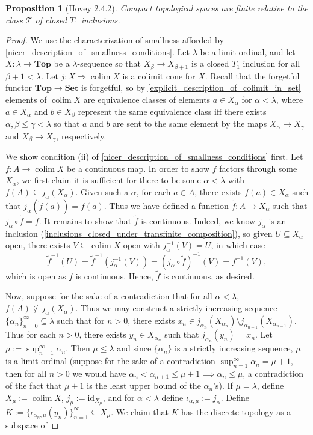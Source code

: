 \documentclass{amsart}
\theoremstyle{plain}
\newtheorem{proposition}[theorem]{Proposition}
\theoremstyle{definition}
\newcommand{\Top}{\mbf{Top}}
\newcommand{\Set}{\mbf{Set}}
\newcommand{\sseq}{\subseteq}
\newcommand{\wt}{\widetilde}
\newcommand{\0}{\mathbf{0}}
\newcommand{\id}{\mathrm{id}}
\newcommand{\cT}{\mathcal T}
\newcommand{\mbf}[1]{\mathbf{#1}}
\newcommand{\ul}{\underline}
\renewcommand{\(}{\left(}
\renewcommand{\)}{\right)}
\DeclareMathOperator*{\colim}{colim}
\begin{document}
\begin{proposition}[Hovey 2.4.2]\label{2.4.2}
  Compact topological spaces are finite relative to the class $\cT$ of closed $T_1$ inclusions.
\end{proposition}
\begin{proof}
  We use the characterization of smallness afforded by \autoref{nicer_description_of_smallness_conditions}. Let $\lambda$ be a limit ordinal, and let $X:\lambda\to\Top$ be a $\lambda$-sequence so that $X_\beta\to X_{\beta+1}$ is a closed $T_1$ inclusion for all $\beta+1<\lambda$. Let $j:X\Rightarrow\ul{\colim X}$ is a colimit cone for $X$. Recall that the forgetful functor $\Top\to\Set$ is forgetful, so by \autoref{explicit_description_of_colimit_in_set} elements of $\colim X$ are equivalence classes of elements $a\in X_\alpha$ for $\alpha<\lambda$, where $a\in X_\alpha$ and $b\in X_\beta$ represent the same equivalence class iff there exists $\alpha,\beta\leq\gamma<\lambda$ so that $a$ and $b$ are sent to the same element by the maps $X_\alpha\to X_\gamma$ and $X_\beta\to X_\gamma$, respectively.

  We show condition (ii) of \autoref{nicer_description_of_smallness_conditions} first. Let $f:A\to\colim X$ be a continuous map. In order to show $f$ factors through some $X_\alpha$, we first claim it is sufficient for there to be some $\alpha<\lambda$ with $f(A)\sseq j_\alpha(X_\alpha)$. Given such a $\alpha$, for each $a\in A$, there exists $\wt f(a)\in X_\alpha$ such that $j_\alpha(\wt f(a))=f(a)$. Thus we have defined a function $\wt f:A\to X_\alpha$ such that $j_\alpha\circ\wt f=f$. It remains to show that $\wt f$ is continuous. Indeed, we know $j_\alpha$ is an inclusion (\autoref{inclusions_closed_under_transfinite_composition}), so given $U\sseq X_\alpha$ open, there exists $V\sseq\colim X$ open with $j_\alpha^{-1}(V)=U$, in which case
  \[\wt f^{-1}(U)=\wt f^{-1}(j_\alpha^{-1}(V))=(j_\alpha\circ\wt f)^{-1}(V)=f^{-1}(V),\]
  which is open as $f$ is continuous. Hence, $\wt f$ is continuous, as desired.

  Now, suppose for the sake of a contradiction that for all $\alpha<\lambda$, $f(A)\not\sseq j_\alpha(X_\alpha)$. Thus we may construct a strictly increasing sequence $\{\alpha_n\}_{n=0}^\infty\sseq\lambda$ such that for $n>0$, there exists $x_n\in j_{\alpha_n}(X_{\alpha_n})\setminus j_{\alpha_{n-1}}(X_{\alpha_{n-1}})$. Thus for each $n>0$, there exists $y_n\in X_{\alpha_n}$ such that $j_{\alpha_n}(y_n)=x_n$. Let $\mu:=\sup_{n=1}^\infty\alpha_n$. Then $\mu\leq\lambda$ and since $\{\alpha_n\}$ is a strictly increasing sequence, $\mu$ is a limit ordinal (suppose for the sake of a contradiction $\sup_{n=1}^\infty\alpha_n=\mu+1$, then for all $n>0$ we would have $\alpha_n<\alpha_{n+1}\leq\mu+1\implies\alpha_n\leq\mu$, a contradiction of the fact that $\mu+1$ is the least upper bound of the $\alpha_n$'s). If $\mu=\lambda$, define $X_\mu:=\colim X$, $j_\mu:=\id_{X_\mu}$, and for $\alpha<\lambda$ define $\iota_{\alpha,\mu}:=j_\alpha$. Define $K:=\{\iota_{\alpha_n,\mu}(y_n)\}_{n=1}^\infty\sseq X_\mu$. We claim that $K$ has the discrete topology as a subspace of


\end{proof}
\end{document}
